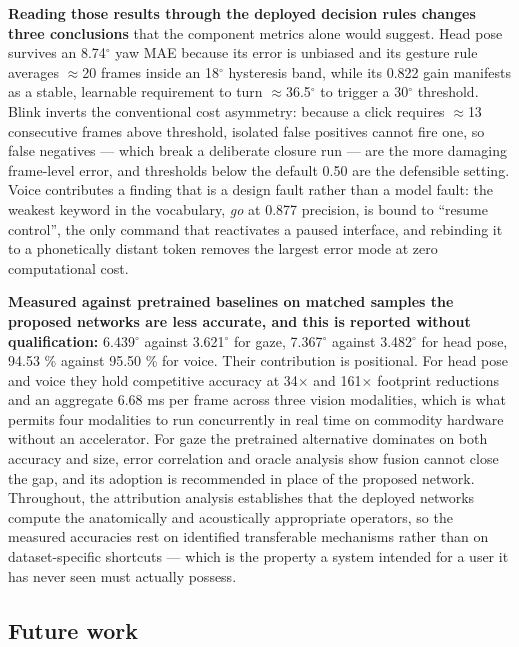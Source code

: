 \textbf{Reading those results through the deployed decision rules changes three conclusions} that the component metrics alone would suggest. Head pose survives an 8.74$^{\circ}$ yaw MAE because its error is unbiased and its gesture rule averages $\approx$20 frames inside an 18$^{\circ}$ hysteresis band, while its 0.822 gain manifests as a stable, learnable requirement to turn $\approx$36.5$^{\circ}$ to trigger a 30$^{\circ}$ threshold. Blink inverts the conventional cost asymmetry: because a click requires $\approx$13 consecutive frames above threshold, isolated false positives cannot fire one, so false negatives --- which break a deliberate closure run --- are the more damaging frame-level error, and thresholds below the default 0.50 are the defensible setting. Voice contributes a finding that is a design fault rather than a model fault: the weakest keyword in the vocabulary, \emph{go} at 0.877 precision, is bound to ``resume control'', the only command that reactivates a paused interface, and rebinding it to a phonetically distant token removes the largest error mode at zero computational cost.

\textbf{Measured against pretrained baselines on matched samples the proposed networks are less accurate, and this is reported without qualification:} 6.439$^{\circ}$ against 3.621$^{\circ}$ for gaze, 7.367$^{\circ}$ against 3.482$^{\circ}$ for head pose, 94.53 \% against 95.50 \% for voice. Their contribution is positional. For head pose and voice they hold competitive accuracy at 34$\times$ and 161$\times$ footprint reductions and an aggregate 6.68 ms per frame across three vision modalities, which is what permits four modalities to run concurrently in real time on commodity hardware without an accelerator. For gaze the pretrained alternative dominates on both accuracy and size, error correlation and oracle analysis show fusion cannot close the gap, and its adoption is recommended in place of the proposed network. Throughout, the attribution analysis establishes that the deployed networks compute the anatomically and acoustically appropriate operators, so the measured accuracies rest on identified transferable mechanisms rather than on dataset-specific shortcuts --- which is the property a system intended for a user it has never seen must actually possess.

\FloatBarrier

\subsection{Future work}

